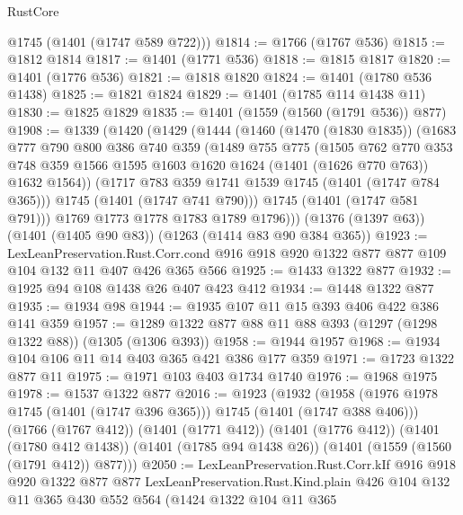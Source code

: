 \begin{lexlean}{RustCore}
\begin{coremodule}
      @1745
      (@1401 (@1747 @589 @722)))
@1814 := @1766 (@1767 @536)
@1815 := @1812 @1814
@1817 := @1401 (@1771 @536)
@1818 := @1815 @1817
@1820 := @1401 (@1776 @536)
@1821 := @1818 @1820
@1824 := @1401 (@1780 @536 @1438)
@1825 := @1821 @1824
@1829 := @1401 (@1785 @114 @1438 @11)
@1830 := @1825 @1829
@1835 := @1401 (@1559 (@1560 (@1791 @536)) @877)
@1908 := @1339
    (@1420
      (@1429
        (@1444
          (@1460
            (@1470 (@1830 @1835))
            (@1683
              @777
              @790
              @800
              @386
              @740
              @359
              (@1489
                @755
                @775
                (@1505
                  @762
                  @770
                  @353
                  @748
                  @359
                  @1566
                  @1595
                  @1603
                  @1620
                  @1624
                  (@1401 (@1626 @770 @763))
                  @1632
                  @1564))
              (@1717 @783 @359 @1741 @1539 @1745 (@1401 (@1747 @784 @365)))
              @1745
              (@1401 (@1747 @741 @790)))
            @1745
            (@1401 (@1747 @581 @791)))
          @1769
          @1773
          @1778
          @1783
          @1789
          @1796)))
    (@1376 (@1397 @63))
    (@1401 (@1405 @90 @83))
    (@1263 (@1414 @83 @90 @384 @365))
@1923 := LexLeanPreservation.Rust.Corr.cond
    @916
    @918
    @920
    @1322
    @877
    @877
    @109
    @104
    @132
    @11
    @407
    @426
    @365
    @566
@1925 := @1433 @1322 @877
@1932 := @1925 @94 @108 @1438 @26 @407 @423 @412
@1934 := @1448 @1322 @877
@1935 := @1934 @98
@1944 := @1935 @107 @11 @15 @393 @406 @422 @386 @141 @359
@1957 := @1289 @1322 @877 @88 @11 @88 @393 (@1297 (@1298 @1322 @88)) (@1305 (@1306 @393))
@1958 := @1944 @1957
@1968 := @1934 @104 @106 @11 @14 @403 @365 @421 @386 @177 @359
@1971 := @1723 @1322 @877 @11
@1975 := @1971 @103 @403 @1734 @1740
@1976 := @1968 @1975
@1978 := @1537 @1322 @877
@2016 := @1923
    (@1932
      (@1958 (@1976 @1978 @1745 (@1401 (@1747 @396 @365))) @1745 (@1401 (@1747 @388 @406)))
      (@1766 (@1767 @412))
      (@1401 (@1771 @412))
      (@1401 (@1776 @412))
      (@1401 (@1780 @412 @1438))
      (@1401 (@1785 @94 @1438 @26))
      (@1401 (@1559 (@1560 (@1791 @412)) @877)))
@2050 := LexLeanPreservation.Rust.Corr.kIf
    @916
    @918
    @920
    @1322
    @877
    @877
    LexLeanPreservation.Rust.Kind.plain
    @426
    @104
    @132
    @11
    @365
    @430
    @552
    @564
    (@1424
      @1322
      @104
      @11
      @365

\end{coremodule}
\end{lexlean}
